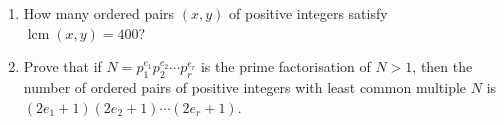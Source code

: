 \begin{enumerate}
\item[(a)] How many ordered pairs $(x,y)$ of positive integers satisfy $\operatorname{lcm}(x,y)=400$?
\item[(b)] Prove that if $N=p_1^{e_1}p_2^{e_2}\cdots p_r^{e_r}$ is the prime factorisation of $N>1$, then the number of ordered pairs of positive integers with least common multiple $N$ is $(2e_1+1)(2e_2+1)\cdots(2e_r+1)$.
\end{enumerate}
